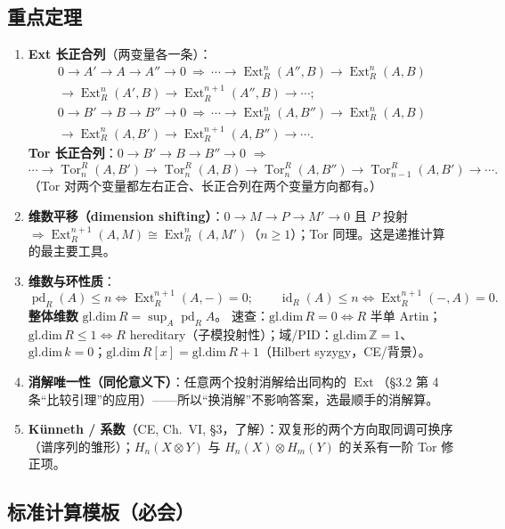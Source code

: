 \documentclass[12pt,a4paper]{ctexart}
\DeclareMathOperator{\Ext}{Ext}
\DeclareMathOperator{\Tor}{Tor}
\DeclareMathOperator{\pd}{pd}
\DeclareMathOperator{\id}{id}
\newcommand{\keypoint}{\text{\textbf{\ensuremath{\bigstar}}\;}}
\newcommand{\method}{\text{\textbf{方法}}\;}
\begin{document}
\subsection{\keypoint 重点定理}

\begin{enumerate}
  \item \textbf{Ext 长正合列}（两变量各一条）：
  \begin{multline*}
    0\to A'\to A\to A''\to0
    \ \Longrightarrow\
    \cdots\to\Ext^n_R(A'',B)\to\Ext^n_R(A,B)\\
    \to\Ext^n_R(A',B)\to\Ext^{n+1}_R(A'',B)\to\cdots;
  \end{multline*}
  \begin{multline*}
    0\to B'\to B\to B''\to0
    \ \Longrightarrow\
    \cdots\to\Ext^n_R(A,B'')\to\Ext^n_R(A,B)\\
    \to\Ext^n_R(A,B')\to\Ext^{n+1}_R(A,B'')\to\cdots.
  \end{multline*}
  \textbf{Tor 长正合列}：$0\to B'\to B\to B''\to0$ $\Rightarrow$
  \[
    \cdots\to\Tor_n^R(A,B')\to\Tor_n^R(A,B)\to\Tor_n^R(A,B'')\to\Tor^R_{n-1}(A,B')\to\cdots.
  \]
  （Tor 对两个变量都左右正合、长正合列在两个变量方向都有。）
  \item \textbf{维数平移（dimension shifting）}：$0\to M\to P\to M'\to0$ 且 $P$ 投射 $\Rightarrow\Ext_R^{n+1}(A,M)\cong\Ext_R^n(A,M')$（$n\ge1$）；Tor 同理。\keypoint 这是递推计算的最主要工具。
  \item \textbf{维数与环性质}：
  \[
    \pd_R(A)\le n\iff\Ext_R^{n+1}(A,-)=0;\qquad
    \id_R(A)\le n\iff\Ext_R^{n+1}(-,A)=0.
  \]
  \textbf{整体维数} $\mathrm{gl.dim}\,R=\sup_A\pd_RA$。
  \keypoint 速查：$\mathrm{gl.dim}\,R=0\iff R$ 半单 Artin；$\mathrm{gl.dim}\,R\le1\iff R$ hereditary（子模投射性）；域/PID：$\mathrm{gl.dim}\,\mathbb Z=1$、$\mathrm{gl.dim}\,k=0$；$\mathrm{gl.dim}\,R[x]=\mathrm{gl.dim}\,R+1$（Hilbert syzygy，CE/背景）。
  \item \textbf{消解唯一性（同伦意义下）}：任意两个投射消解给出同构的 $\Ext$（\S3.2 第 4 条“比较引理”的应用）——所以“换消解”不影响答案，选最顺手的消解算。
  \item \textbf{K\"unneth / 系数}（CE, Ch.~VI, \S3，了解）：双复形的两个方向取同调可换序（谱序列的雏形）；$H_n(X\otimes Y)$ 与 $H_n(X)\otimes H_m(Y)$ 的关系有一阶 Tor 修正项。
\end{enumerate}

\subsection{\method 标准计算模板（必会）}
\end{document}
